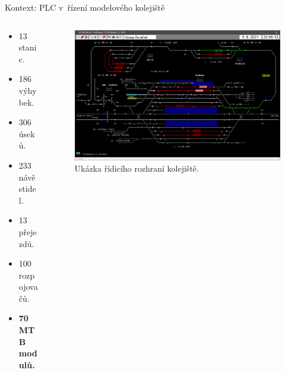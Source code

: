 \documentclass[aspectratio=169]{beamer}
\begin{document}
\begin{frame}{Kontext: PLC v řízení modelového kolejiště}
\begin{columns}
	\begin{column}{.3\textwidth}
		\begin{itemize}
		\item 13 stanic.
		\item 186 výhybek.
		\item 306 úseků.
		\item 233 návěstidel.
		\item 13 přejezdů.
		\item 100 rozpojovačů.
		\item \textbf{70 MTB modulů.}
		\end{itemize}
	\end{column}
	\begin{column}{.65\textwidth}
		\begin{figure}
		\includegraphics[width=\columnwidth]{data/sk.png}
		\caption{Ukázka řídicího rozhraní kolejiště.}
		\end{figure}
	\end{column}
\end{columns}
\end{frame}

\end{document}
